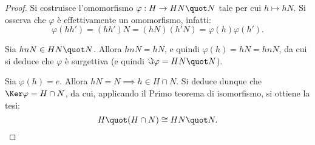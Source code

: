 \documentclass[12pt]{scrartcl}
\begin{document}
	\begin{proof}
		Si costruisce l'omomorfismo $\varphi : H \to HN \quot N$
		tale per cui $h \mapsto hN$. Si osserva che $\varphi$ è
		effettivamente un omomorfismo, infatti:
		\[ \varphi(hh') = (hh')N = (hN) (h'N) = \varphi(h) \varphi(h'). \]
		
		Sia $hnN \in HN \quot N$. Allora $hnN = hN$, e quindi
		$\varphi(h) = hN = hnN$, da cui si deduce che
		$\varphi$ è surgettiva (e quindi $\Im \varphi = HN \quot N$).
		\medskip

		
		Sia $\varphi(h) = e$. Allora $hN = N \implies h \in H \cap N$.
		Si deduce dunque che $\Ker \varphi = H \cap N$, da cui,
		applicando il Primo teorema di isomorfismo, si ottiene
		la tesi:
		\[ H \quot (H \cap N) \cong HN \quot N. \]
	\end{proof}
\end{document}
